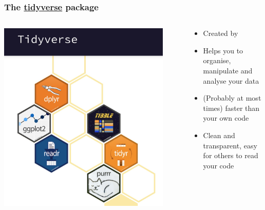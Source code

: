 \documentclass{beamer}
\begin{document}
\begin{frame}
\frametitle{The \href{https://www.tidyverse.org}{tidyverse} package}
\begin{columns}
\begin{center}
\includegraphics[width=0.9\textwidth]{tidy.jpg}
\end{center}
\begin{center}
\begin{itemize}
\item Created by {}
\item Helps you to organise, manipulate and analyse your data
\item (Probably at most times) faster than your own code 
\item Clean and transparent, easy for others to read your code
\end{itemize}
\end{center}
\end{columns}
\end{frame}
\end{document}
